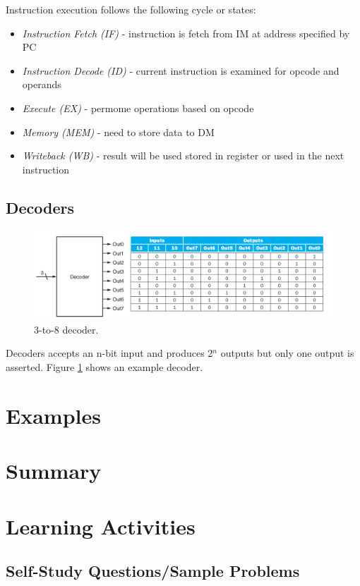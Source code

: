 \documentclass[a4paper, 11pt,oneside]{article}
\begin{document}
Instruction execution follows the following cycle or states:

\begin{itemize}
	\item {\textit{Instruction Fetch (IF)} - instruction is fetch from IM at address specified by PC}
	\item {\textit{Instruction Decode (ID)} - current instruction is examined for opcode and operands }
	\item {\textit{Execute (EX)} - permome operations based on opcode}
	\item {\textit{Memory (MEM)} - need to store data to DM}
	\item {\textit{Writeback (WB)} - result will be used stored in register or used in the next instruction}
\end{itemize}


\subsection{Decoders}
\begin{figure}
	\includegraphics[width=\linewidth]{decoder.png}
	\caption{3-to-8 decoder.}
	\label{fig:decoder} 
\end{figure}

Decoders accepts an n-bit input and produces 2$^n$  outputs but only one output is asserted. Figure \ref{fig:decoder} shows an example decoder.



\section{Examples}



\section{Summary}

\section{Learning Activities}

\subsection{Self-Study Questions/Sample Problems}


\end{document}

